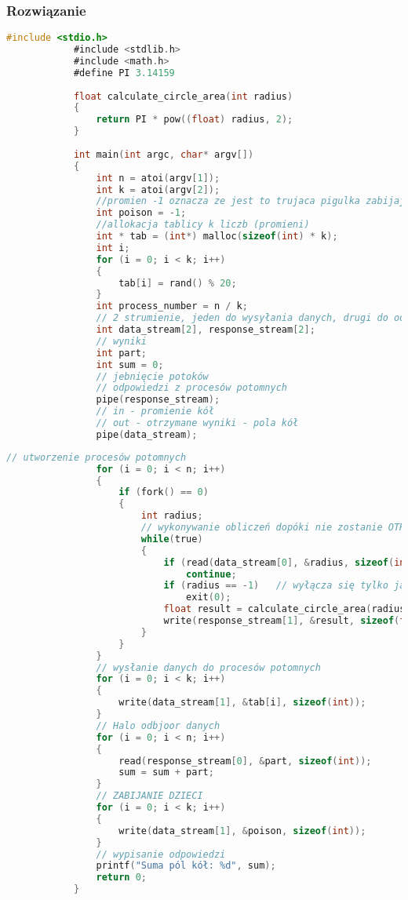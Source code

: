 		\subsubsection{Rozwiązanie}
			\begin{lstlisting}[language=C]
			#include <stdio.h>
			#include <stdlib.h>
			#include <math.h>
			#define PI 3.14159
			
			float calculate_circle_area(int radius)
			{
				return PI * pow((float) radius, 2);
			}
			
			int main(int argc, char* argv[])
			{
				int n = atoi(argv[1]);
				int k = atoi(argv[2]);
				//promien -1 oznacza ze jest to trujaca pigulka zabijajaca proces potomny
				int poison = -1;		
				//allokacja tablicy k liczb (promieni)
				int * tab = (int*) malloc(sizeof(int) * k);
				int i;
				for (i = 0; i < k; i++)
				{
					tab[i] = rand() % 20;
				}
				int process_number = n / k;
				// 2 strumienie, jeden do wysyłania danych, drugi do odbioru odpowiedzi
				int data_stream[2], response_stream[2];
				// wyniki
				int part;
				int sum = 0;
				// jebnięcie potoków
				// odpowiedzi z procesów potomnych
				pipe(response_stream);
				// in - promienie kół
				// out - otrzymane wyniki - pola kół
				pipe(data_stream);
			\end{lstlisting}
			\newpage
			\begin{lstlisting}[language=C]
				// utworzenie procesów potomnych
				for (i = 0; i < n; i++)
				{
					if (fork() == 0)
					{
						int radius;
						// wykonywanie obliczeń dopóki nie zostanie OTRUTY(!)
						while(true)
						{
							if (read(data_stream[0], &radius, sizeof(int)) != sizeof(int))
								continue;
							if (radius == -1)	// wyłącza się tylko jak otrzymamy pigułkę
								exit(0);
							float result = calculate_circle_area(radius);
							write(response_stream[1], &result, sizeof(float));
						}
					}
				}
				// wysłanie danych do procesów potomnych
				for (i = 0; i < k; i++)
				{
					write(data_stream[1], &tab[i], sizeof(int));
				}
				// Halo odbjoor danych
				for (i = 0; i < n; i++)
				{
					read(response_stream[0], &part, sizeof(int));
					sum = sum + part;
				}
				// ZABIJANIE DZIECI
				for (i = 0; i < k; i++)
				{
					write(data_stream[1], &poison, sizeof(int));
				}
				// wypisanie odpowiedzi
				printf("Suma pól kół: %d", sum);
				return 0;
			}
			
			\end{lstlisting}
		\newpage